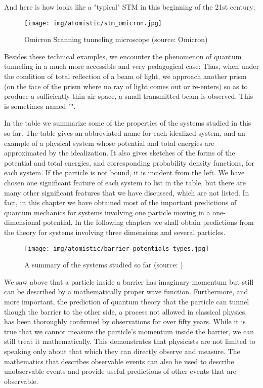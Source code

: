 	And here is how looks like  a "typical" STM in this beginning of the 21st century:
	\begin{figure}[H]
		\centering
		\texttt{[image: img/atomistic/stm\_omicron.jpg]}	
		\caption[Omicron Scanning tunneling microscope]{Omicron Scanning tunneling microscope (source: Omicron)}
	\end{figure}
	Besides these technical examples, we encounter the phenomenon of quantum tunneling in a much more accessible and very pedagogical case: Thus, when under the condition of total reflection of a beam of light, we approach another prism (on the face of the prism where no ray of light comes out or re-enters) so as to produce a sufficiently thin air space, a small transmitted beam is observed. This is sometimes named "".
	
	In the table we summarize some of the properties of the systems studied in this so far. The table gives an abbreviated name for each idealized system, and an example of a physical system whose potential and total energies are approximated by the idealization. It also gives sketches of the forms of the potential and total energies, and corresponding probability density functions, for each system. If the particle is not bound, it is incident from the left. We have chosen one significant feature of each system to list in the table, but there are many other significant features that we have discussed, which are not listed. In fact, in this chapter we have obtained most of the important predictions of quantum mechanics for systems involving one particle moving in a one-dimensional potential. In the following chapters we shall obtain predictions from the theory for systems involving three dimensions and several particles.
	\begin{figure}[H]
		\centering
		\texttt{[image: img/atomistic/barrier\_potentials\_types.jpg]}	
		\caption[]{A summary of the systems studied so far (source: \cite{eisberg1985quantum})}
	\end{figure}
	We saw above that a particle inside a barrier has imaginary momentum but still can be described by a mathematically proper wave function. Furthermore, and more important, the prediction of quantum theory that the particle can tunnel though the barrier to the other side, a process not allowed in classical physics, has been thoroughly confirmed by observations for over fifty years. While it is true that we cannot measure the particle's momentum inside the barrier, we can still treat it mathematically. This demonstrates that physicists are not limited to speaking only about that which they can directly observe and measure. The mathematics that describes observable events can also be used to describe unobservable events and provide useful predictions of other events that are observable.
	

